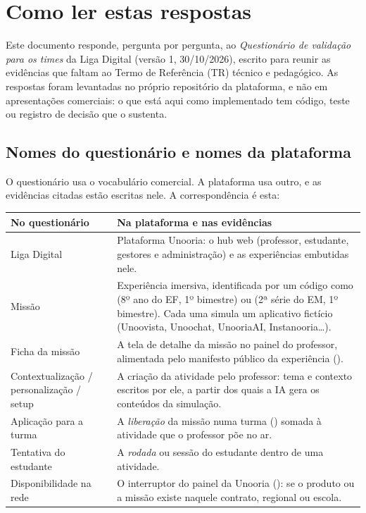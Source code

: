 \chapter{Como ler estas respostas}
\label{cap:como-ler}

Este documento responde, pergunta por pergunta, ao \emph{Questionário de
validação para os times} da Liga Digital (versão 1, 30/10/2026), escrito para
reunir as evidências que faltam ao Termo de Referência (TR) técnico e
pedagógico. As respostas foram levantadas no próprio repositório da
plataforma, e não em apresentações comerciais: o que está aqui como
implementado tem código, teste ou registro de decisão que o sustenta.

\section{Nomes do questionário e nomes da plataforma}

O questionário usa o vocabulário comercial. A plataforma usa outro, e as
evidências citadas estão escritas nele. A correspondência é esta:

\begin{center}
\footnotesize\renewcommand{\arraystretch}{1.3}
\begin{tabularx}{\linewidth}{@{}L{42mm}Y@{}}
\toprule
\textbf{No questionário} & \textbf{Na plataforma e nas evidências}\\
\midrule
Liga Digital & Plataforma Unooria: o hub web (professor, estudante, gestores
  e administração) e as experiências embutidas nele.\\
Missão & Experiência imersiva, identificada por um código como
   (8º ano do EF, 1º bimestre) ou  (2ª série do
  EM, 1º bimestre). Cada uma simula um aplicativo fictício (Unoovista,
  Unoochat, UnooriaAI, Instanooria\ldots).\\
Ficha da missão & A tela de detalhe da missão no painel do professor,
  alimentada pelo manifesto público da experiência
  ().\\
Contextualização / personalização / setup & A criação da atividade pelo
  professor: tema e contexto escritos por ele, a partir dos quais a IA gera os
  conteúdos da simulação.\\
Aplicação para a turma & A \emph{liberação} da missão numa turma
  () somada à atividade que o professor põe no ar.\\
Tentativa do estudante & A \emph{rodada} ou sessão do estudante dentro de uma
  atividade.\\
Disponibilidade na rede & O interruptor do painel da Unooria
  (): se o produto ou a missão existe naquele contrato, regional
  ou escola.\\
\bottomrule
\end{tabularx}
\end{center}

